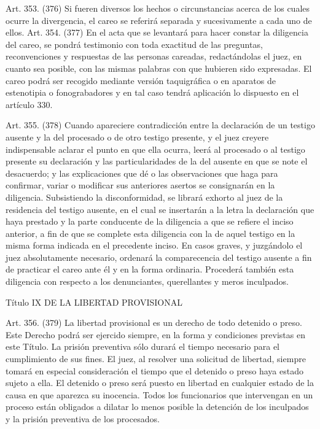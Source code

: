     Art. 353. (376) Si fueren diversos los hechos o circunstancias acerca de los cuales ocurre la divergencia, el careo se referirá separada y sucesivamente a cada uno de ellos.
    Art. 354. (377) En el acta que se levantará para hacer constar la diligencia del careo, se pondrá testimonio con toda exactitud de las preguntas, reconvenciones y respuestas de las personas careadas, redactándolas el juez, en cuanto sea posible, con las mismas palabras con que hubieren sido expresadas.
    El careo podrá ser recogido mediante versión taquigráfica o en aparatos de estenotipia o fonograbadores y en tal caso tendrá aplicación lo dispuesto en el artículo 330.

    Art. 355. (378) Cuando apareciere contradicción entre la declaración de un testigo ausente y la del procesado o de otro testigo presente, y el juez creyere indispensable aclarar el punto en que ella ocurra, leerá al procesado o al testigo presente su declaración y las particularidades de la del ausente en que se note el desacuerdo; y las explicaciones que dé o las observaciones que haga para confirmar, variar o modificar sus anteriores asertos se consignarán en la diligencia.
    Subsistiendo la disconformidad, se librará exhorto al juez de la residencia del testigo ausente, en el cual se insertarán a la letra la declaración que haya prestado y la parte conducente de la diligencia a que se refiere el inciso anterior, a fin de que se complete esta diligencia con la de aquel testigo en la misma forma indicada en el precedente inciso.
    En casos graves, y juzgándolo el juez absolutamente necesario, ordenará la comparecencia del testigo ausente a fin de practicar el careo ante él y en la forma ordinaria. Procederá también esta diligencia con respecto a los denunciantes, querellantes y meros inculpados.

  Título IX
  DE LA LIBERTAD PROVISIONAL



    Art. 356. (379) La libertad provisional es un derecho de todo detenido o preso. Este Derecho podrá ser ejercido siempre, en la forma y condiciones previstas en este Título.
    La prisión preventiva sólo durará el tiempo necesario para el cumplimiento de sus fines. El juez, al resolver una solicitud de libertad, siempre tomará en especial consideración el tiempo que el detenido o preso haya estado sujeto a ella.
    El detenido o preso será puesto en libertad en cualquier estado de la causa en que aparezca su inocencia.
    Todos los funcionarios que intervengan en un proceso están obligados a dilatar lo menos posible la detención de los inculpados y la prisión preventiva de los procesados.


